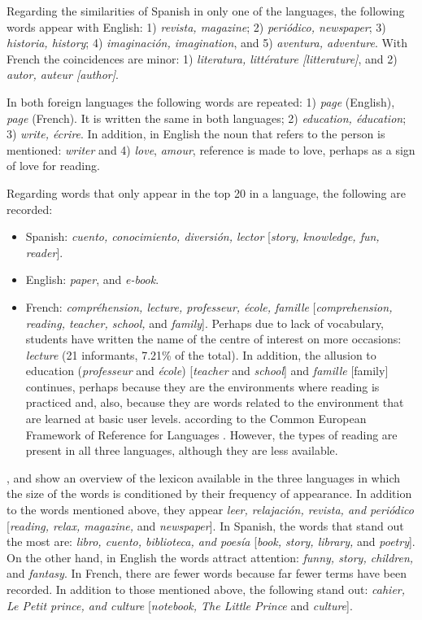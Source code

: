 \documentclass[english]{textolivre}
\begin{document}
Regarding the similarities of Spanish in only one of the languages, the following words appear with English: 1) \textit{revista, magazine}; 2) \textit{periódico, newspaper}; 3) \textit{historia, history}; 4) \textit{imaginación, imagination}, and 5) \textit{aventura, adventure}. With French the coincidences are minor: 1) \textit{literatura, littérature [litterature]}, and 2) \textit{autor, auteur [author]}.

In both foreign languages the following words are repeated: 1) \textit{page} (English), \textit{page} (French). It is written the same in both languages; 2) \textit{education, éducation}; 3) \textit{write, écrire}. In addition, in English the noun that refers to the person is mentioned: \textit{writer} and 4) \textit{love}, \textit{amour}, reference is made to love, perhaps as a sign of love for reading.

Regarding words that only appear in the top 20 in a language, the following are recorded:

\begin{itemize}
    \item Spanish: \textit{cuento, conocimiento, diversión, lector} [\textit{story, knowledge, fun, reader}].
    \item English: \textit{paper}, and \textit{e-book}.
    \item French: \textit{compréhension, lecture, professeur, école, famille} [\textit{comprehension, reading, teacher, school,} and \textit{family}]. Perhaps due to lack of vocabulary, students have written the name of the centre of interest on more occasions: \textit{lecture} (21 informants, 7.21\% of the total). In addition, the allusion to education (\textit{professeur} and \textit{école}) [\textit{teacher} and \textit{school}] and \textit{famille} [family] continues, perhaps because they are the environments where reading is practiced and, also, because they are words related to the environment that are learned at basic user levels. according to the Common European Framework of Reference for Languages \cite{consejo_de_europa_marco_2002}. However, the types of reading are present in all three languages, although they are less available.
\end{itemize}

,  and  show an overview of the lexicon available in the three languages in which the size of the words is conditioned by their frequency of appearance. In addition to the words mentioned above, they appear \textit{leer, relajación, revista, and periódico} [\textit{reading, relax, magazine,} and \textit{newspaper}]. In Spanish, the words that stand out the most are:\textit{ libro, cuento, biblioteca, and poesía} [\textit{book, story, library,} and \textit{poetry}]. On the other hand, in English the words attract attention: \textit{funny, story, children,} and \textit{fantasy}. In French, there are fewer words because far fewer terms have been recorded. In addition to those mentioned above, the following stand out: \textit{cahier, Le Petit prince, and culture} [\textit{notebook, The Little Prince} and \textit{culture}].
\end{document}
